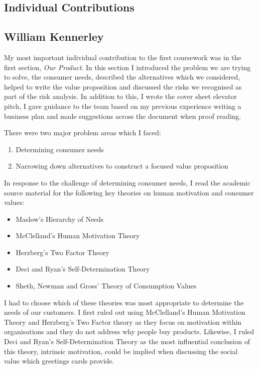 \documentclass[10pt,a4paper]{article}
\begin{document}
\begin{appendices}
\clearpage

\section{Individual Contributions}\label{sec:individualContributions}
\subsection{William Kennerley}\label{subsec:williamKennerley}

My most important individual contribution to the first coursework was in the first section, \textit{Our Product}. In this section I introduced the problem we are trying to solve, the consumer needs, described the alternatives which we considered, helped to write the value proposition and discussed the risks we recognised as part of the risk analysis. In addition to this, I wrote the cover sheet elevator pitch, I gave guidance to the team based on my previous experience writing a business plan and made suggestions across the document when proof reading.

There were two major problem areas which I faced:
\begin{enumerate}
  \item Determining consumer needs
  \item Narrowing down alternatives to construct a focused value proposition
\end{enumerate}
In response to the challenge of determining consumer needs, I read the academic source material for the following key theories on human motivation and consumer values:
\begin{itemize}
  \item Maslow's Hierarchy of Needs
  \item McClelland's Human Motivation Theory
  \item Herzberg's Two Factor Theory
  \item Deci and Ryan's Self-Determination Theory
  \item Sheth, Newman and Gross' Theory of Consumption Values
\end{itemize}

I had to choose which of these theories was most appropriate to determine the needs of our customers. I first ruled out using McClelland's Human Motivation Theory and Herzberg's Two Factor theory as they focus on motivation within organisations and they do not address why people buy products. Likewise, I ruled Deci and Ryan's Self-Determination Theory as the most influential conclusion of this theory, intrinsic motivation, could be implied when discussing the social value \citep{sheth1991we} which greetings cards provide.


\end{appendices}
\end{document}

